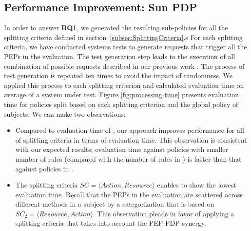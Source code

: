 \subsection{Performance Improvement: Sun PDP}\label{subsec:performanceimprovement}
In order to answer \textbf{RQ1}, we generated the resulting sub-policies for all the splitting criteria defined in 
section~\ref{subsec:SplittingCriteria}.s
For each splitting criteria, we have conducted systems tests to generate requests that trigger all the PEPs in the evaluation. 
The test generation step leads to the execution of all combination of possible requests described in our previous work \cite{testcase}.  
The process of test generation is repeated ten times to avoid the impact of randomness.
We applied this process to each splitting criterion and calculated evaluation time on average of a system under test.
Figure \ref{fig:processing time} presents evaluation time for policies split
based on each splitting criterion and the global policy of subjects. We can make two observations:
\begin{itemize}
\item Compared to evaluation time of , our approach improves performance for all of splitting criteria
in terms of evaluation time. This observation is consistent with our expected results; evaluation time against
policies with smaller number of rules (compared with the number of rules in ) is faster than that against
policies in .
\item The splitting criteria \normalsize $SC=\langle Action, Resource\rangle$ enables to show the lowest evaluation time. 
Recall that the PEPs in the evaluation are scattered across different methods in a subject by a categorization 
that is based on $SC_{2}=\langle Resource,Action\rangle$. This observation pleads in favor of applying a splitting criteria 
that takes into account the PEP-PDP synergy.
\end{itemize}
